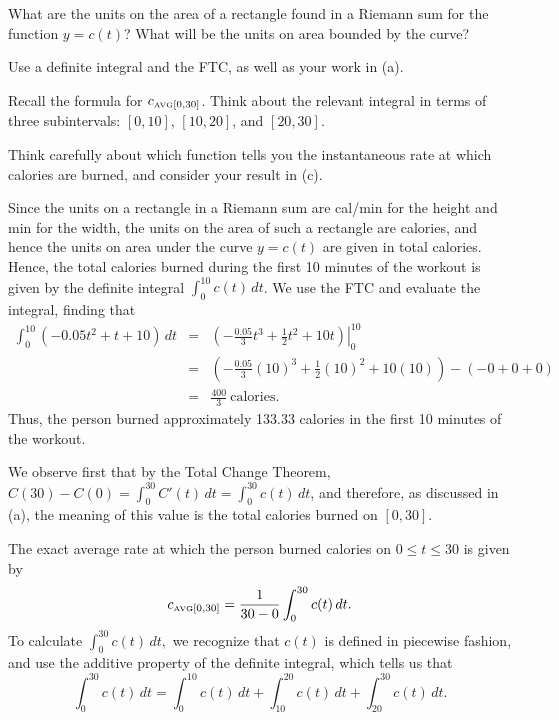 \begin{bighint}
\ba
	\item What are the units on the area of a rectangle found in a Riemann sum for the function $y= c(t)$?  What will be the units on area bounded by the curve?
	\item Use a definite integral and the FTC, as well as your work in (a).
	\item Recall the formula for $c_{\mbox{\tiny{AVG}}[0,30]}$.  Think about the relevant integral in terms of three subintervals: $[0,10]$, $[10,20]$, and $[20,30]$.
	\item Think carefully about which function tells you the instantaneous rate at which calories are burned, and consider your result in (c).
\ea
\end{bighint}
\begin{activitySolution}
\ba
	\item Since the units on a rectangle in a Riemann sum are cal/min for the height and min for the width, the units on the area of such a rectangle are calories, and hence the units on area under the curve $y = c(t)$ are given in total calories.  Hence, the total calories burned during the first 10 minutes of the workout is given by the definite integral $\int_0^{10} c(t) \, dt$.  We use the FTC and evaluate the integral, finding that
	\begin{eqnarray*}
		\int_0^{10} (-0.05t^2 + t + 10) \, dt & = & \left. \left( -\frac{0.05}{3} t^3 + \frac{1}{2} t^2 + 10t \right) \right|_0^{10} \\
				& = &  \left( -\frac{0.05}{3} (10)^3 + \frac{1}{2} (10)^2 + 10(10) \right) - (-0 + 0 + 0) \\
				& = & \frac{400}{3} \ \mbox{calories}.
	\end{eqnarray*}
	Thus, the person burned approximately 133.33 calories in the first 10 minutes of the workout.
	\item We observe first that by the Total Change Theorem, $C(30) - C(0) = \int_0^{30} C'(t) \, dt = \int_0^{30} c(t) \, dt$, and therefore, as discussed in (a), the meaning of this value is the total calories burned on $[0,30]$.
	\item The exact average rate at which the person burned calories on $0 \le t \le 30$ is given by 
	$$c_{\mbox{\tiny{AVG}}[0,30]} = \frac{1}{30-0} \int_0^{30} c(t) \, dt.$$
	To calculate $\int_0^{30} c(t) \, dt,$ we recognize that $c(t)$ is defined in piecewise fashion, and use the additive property of the definite integral, which tells us that 
	$$\int_0^{30} c(t) \, dt = \int_0^{10} c(t) \, dt +  \int_{10}^{20} c(t) \, dt +  \int_{20}^{30} c(t) \, dt.$$

\end{activitySolution}

